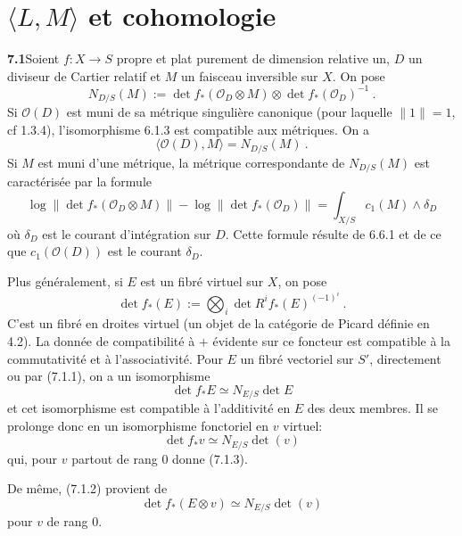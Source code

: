 \documentclass[12pt,a4paper]{article}
\theoremstyle{plain}
\theoremstyle{definition}
\theoremstyle{remark}
\newcommand{\calO}{\mathcal{O}}
\begin{document}
\section{$\langle L, M \rangle$ et cohomologie}

\noindent\textbf{7.1}\quad Soient $f: X \to S$ propre et plat purement de dimension relative un, $D$ un diviseur de Cartier relatif et $M$ un faisceau inversible sur $X$. On pose
\begin{equation}
\label{eq:7.1.1}
N_{D/S}(M) := \det f_*(\calO_D \otimes M) \otimes \det f_*(\calO_D)^{-1} \ .
\end{equation}
Si $\calO(D)$ est muni de sa m\'etrique singuli\`ere canonique (pour laquelle $\|1\| = 1$, cf 1.3.4), l'isomorphisme 6.1.3 est compatible aux m\'etriques. On a
\begin{equation}
\label{eq:7.1.2}
\langle \calO(D), M \rangle = N_{D/S}(M) \ .
\end{equation}
Si $M$ est muni d'une m\'etrique, la m\'etrique correspondante de $N_{D/S}(M)$ est caract\'eris\'ee par la formule
\begin{equation}
\label{eq:7.1.3}
\log \|\det f_*(\calO_D \otimes M)\| - \log \|\det f_*(\calO_D)\| = \int_{X/S} c_1(M) \wedge \delta_D
\end{equation}
o\`u $\delta_D$ est le courant d'int\'egration sur $D$. Cette formule r\'esulte de 6.6.1 et de ce que $c_1(\calO(D))$ est le courant $\delta_D$.

Plus g\'en\'eralement, si $E$ est un fibr\'e virtuel sur $X$, on pose
\begin{equation}
\label{eq:7.1.4}
\det f_*(E) := \bigotimes_i \det R^i f_*(E)^{(-1)^i} \ .
\end{equation}
C'est un fibr\'e en droites virtuel (un objet de la cat\'egorie de Picard d\'efinie en 4.2). La donn\'ee de compatibilit\'e \`a $+$ \'evidente sur ce foncteur est compatible \`a la commutativit\'e et \`a l'associativit\'e. Pour $E$ un fibr\'e vectoriel sur $S'$, directement ou par (7.1.1), on a un isomorphisme
\[
\det f_* E \simeq N_{E/S} \det E
\]
et cet isomorphisme est compatible \`a l'additivit\'e en $E$ des deux membres. Il se prolonge donc en un isomorphisme fonctoriel en $v$ virtuel:
\begin{equation}
\label{eq:7.1.5}
\det f_* v \simeq N_{E/S} \det(v)
\end{equation}
qui, pour $v$ partout de rang 0 donne (7.1.3).

De m\^eme, (7.1.2) provient de
\begin{equation}
\label{eq:7.1.6}
\det f_*(E \otimes v) \simeq N_{E/S} \det(v)
\end{equation}
pour $v$ de rang 0.
\end{document}
